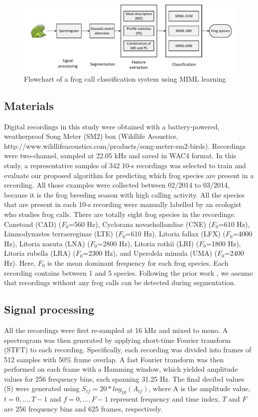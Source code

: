 \begin{figure}[htb!]
\centering
\includegraphics[width=\textwidth]{image/Ch6/flowchart.pdf}
\caption{Flowchart of a frog call classification system using MIML learning}
\label{fig:flowchart}
\end{figure}



\subsection{Materials}
Digital recordings in this study were obtained with a battery-powered, weatherproof Song
Meter (SM2) box (Wildlife Acoustics, http://www.wildlifeacoustics.com/products/song-meter-sm2-birds). Recordings were two-channel, sampled at 22.05 kHz and saved in WAC4 format. In this study, a representative samples of 342 10-s recordings was selected to train and evaluate our proposed algorithm for predicting which frog species are present in a recording. All those examples were collected between 02/2014 to 03/2014, because it is the frog breeding season with high calling activity. All the species that are present in each 10-s recording were manually labelled by an ecologist who studies frog calls.
There are totally eight frog species in the recordings: Canetoad (CAD) 
($F_{0}$=560 Hz), Cyclorana novaehollandiae (CNE) ($F_{0}$=610 Hz), Limnodynastes terraereginae (LTE) ($F_{0}$=610 Hz), Litoria fallax (LFX) ($F_{0}$=4000 Hz), Litoria nasuta (LNA) ($F_{0}$=2800 Hz), Litoria rothii (LRI) ($F_{0}$=1800 Hz), Litoria rubella (LRA) ($F_{0}$=2300 Hz), and Uperolela mimula (UMA) ($F_{0}$=2400 Hz). Here, $F_{0}$ is the mean dominant frequency for each frog species. Each recording contains between 1 and 5 species. Following the prior work \cite{briggs2012acoustic}, we assume that recordings without any frog calls can be detected during segmentation.


\subsection{Signal processing}
All the recordings were first re-sampled at 16 kHz and mixed to mono. A spectrogram was then generated by applying short-time Fourier transform (STFT) to each recording. Specifically, each recording was
divided into frames of 512 samples with 50\% frame overlap.
A fast Fourier transform was then performed on each frame with a Hamming window, which yielded amplitude values for 256 frequency bins, each spanning 31.25 Hz. The final
decibel values (S) were generated using $S_{tf} = 20*log_{10}(A_{tf})$,
where A is the amplitude value, $t=0,...,T-1$ and $f=0,...,F-1$ represent frequency and time index, $T$ and $F$ are 256 frequency bins and 625 frames, respectively. 

